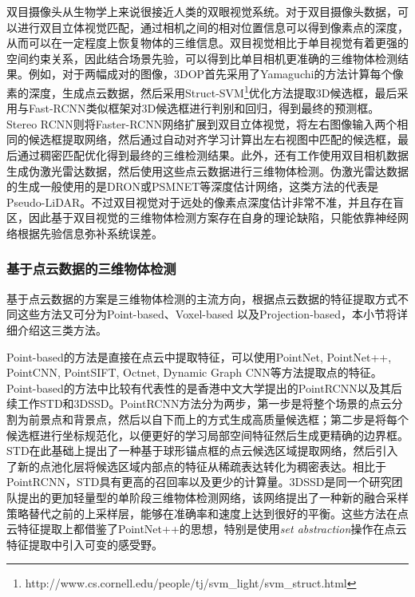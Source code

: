 双目摄像头从生物学上来说很接近人类的双眼视觉系统。对于双目摄像头数据，可以进行双目立体视觉匹配，通过相机之间的相对位置信息可以得到像素点的深度，从而可以在一定程度上恢复物体的三维信息。双目视觉相比于单目视觉有着更强的空间约束关系，因此结合场景先验，可以得到比单目相机更准确的三维物体检测结果。例如，对于两幅成对的图像，3DOP\cite{chen20183d}首先采用了Yamaguchi的方法\cite{Yamaguchi2014Efficient}计算每个像素的深度，生成点云数据，然后采用Struct-SVM\footnote[4]{http://www.cs.cornell.edu/people/tj/svm\_light/svm\_struct.html}优化方法\cite{structSVM}提取3D候选框，最后采用与Fast-RCNN\cite{girshick2015fast}类似框架对3D候选框进行判别和回归，得到最终的预测框。Stereo RCNN\cite{licvpr2019}则将Faster-RCNN\cite{ren2015faster}网络扩展到双目立体视觉，将左右图像输入两个相同的候选框提取网络，然后通过自动对齐学习计算出左右视图中匹配的候选框，最后通过稠密匹配优化得到最终的三维检测结果。此外，还有工作使用双目相机数据生成伪激光雷达数据，然后使用这些点云数据进行三维物体检测。伪激光雷达数据的生成一般使用的是DRON\cite{DRON}或PSMNET\cite{chang2018pyramid}等深度估计网络，这类方法的代表是Pseudo-LiDAR\cite{Wang_2019_CVPR,you2020pseudolidar}。不过双目视觉对于远处的像素点深度估计非常不准，并且存在盲区，因此基于双目视觉的三维物体检测方案存在自身的理论缺陷，只能依靠神经网络根据先验信息弥补系统误差。

\subsubsection{基于点云数据的三维物体检测}

基于点云数据的方案是三维物体检测的主流方向，根据点云数据的特征提取方式不同这些方法又可分为Point-based、Voxel-based 以及Projection-based，本小节将详细介绍这三类方法。

Point-based的方法是直接在点云中提取特征，可以使用PointNet\cite{qi2017pointnet}, PointNet++\cite{qi2017pointnet++}, PointCNN\cite{PointCNN}, PointSIFT\cite{JiangPointSIFT}, Octnet\cite{RieglerOctNet}, Dynamic Graph CNN\cite{WangDynamic}等方法提取点的特征。Point-based的方法中比较有代表性的是香港中文大学提出的PointRCNN\cite{shi2019pointrcnn}以及其后续工作STD\cite{std2019yang}和3DSSD\cite{yang3DSSD20}。PointRCNN方法分为两步，第一步是将整个场景的点云分割为前景点和背景点，然后以自下而上的方式生成高质量候选框；第二步是将每个候选框进行坐标规范化，以便更好的学习局部空间特征然后生成更精确的边界框。STD在此基础上提出了一种基于球形锚点框的点云候选区域提取网络，然后引入了新的点池化层将候选区域内部点的特征从稀疏表达转化为稠密表达。相比于PointRCNN，STD具有更高的召回率以及更少的计算量。3DSSD是同一个研究团队提出的更加轻量型的单阶段三维物体检测网络，该网络提出了一种新的融合采样策略替代之前的上采样层，能够在准确率和速度上达到很好的平衡。这些方法在点云特征提取上都借鉴了PointNet++的思想，特别是使用\textit{set abstraction}操作在点云特征提取中引入可变的感受野。

